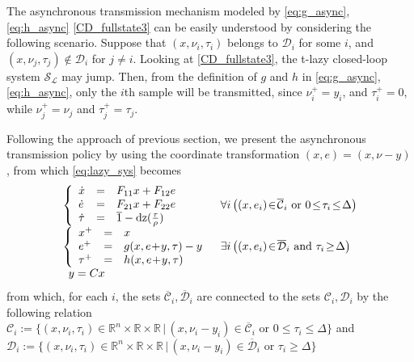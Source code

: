 \documentclass[twocolumn]{autart}
\newcommand{\realn}{\real^n}
\newcommand\real{\ensuremath{{\mathbb R}}}
\newcommand\dz{\mathrm{dz}}
\begin{document}
{
The asynchronous transmission mechanism modeled by  
\eqref{eq:g_async}, \eqref{eq:h_async} \eqref{CD_fullstate3} 
can be easily understood by considering the following scenario.
}
Suppose that $(x,\nu_i,\tau_i)$ belongs to $\mathcal{D}_i$
for some $i$, and $(x,\nu_j,\tau_j) \notin \mathcal{D}_i$ for $j\neq i$. 
Looking at \eqref{CD_fullstate3}, the t-lazy closed-loop system 
$\mathcal{S}_\mathcal{L}$ may jump. Then,
from the definition of $g$ and $h$  in \eqref{eq:g_async}, 
\eqref{eq:h_async}, only the $i$th sample
will be transmitted, since $\nu_i^+ = y_i$, and $\tau_i^+=0$, 
while $\nu_j^+=\nu_j$ and $\tau_j^+=\tau_j$.



Following the approach of previous section, we present the asynchronous
transmission policy by using the coordinate 
transformation $(x,e)=(x,\nu-y)$, from which \eqref{eq:lazy_sys} becomes
\begin{equation}
\label{eq:elazy_sys2}
\begin{array}{ll}
	 \left\{ \begin{array}{lll}
	 \dot{x} & = & F_{11}x + F_{12}e  \\
  	 \dot{e} & = & F_{21}x  +F_{22}e \\
	 \dot{\tau} &=& \overline{1}-\dz(\frac{\tau}{\rho}) \\
	 \end{array}\right. \hspace{2mm}  & 
	 \forall i\,\big(
	  (x,e_i)\!\in\! \overline{\mathcal{C}}_i 
	  \mbox{ or } 0 \!\leq\! \tau_i \!\leq\! \Delta
	  \big) \\
	 \left\{\begin{array}{lll}
	 {x}^+ & = & x \\
	 {e}^+ & = & g(x,e\!+\!y,\tau) - y \\ 
	 {\tau}^+ & = & h(x,e\!+\!y,\tau)\\ 
	 \end{array} \right.  & 
         \exists i\,\big(
	  (x,e_i)\!\in\! \overline{\mathcal{D}}_i 
	  \mbox{ and } \tau_i \!\geq\! \Delta
	  \big)  \\
	 \begin{array}{lll}
		y = Cx  \hspace{16mm} & & \\
	 \end{array} &
 \end{array}
\end{equation}
from which, for each $i$, the sets $\overline{\mathcal{C}}_i,\overline{\mathcal{D}}_i$
are connected to the sets $\mathcal{C}_i,\mathcal{D}_i$ by the following relation
$\mathcal{C}_i :=
\{(x,\nu_i,\tau_i) \in \realn \times \real \times \real \,|\, 
(x,\nu_i-y_i)\in \overline{\mathcal{C}}_i \mbox{ or } 0 \leq \tau_i \leq \Delta \}$
and 
$\mathcal{D}_i :=
\{(x,\nu_i,\tau_i) \in \realn \times \real \times \real \,|\, 
(x,\nu_i-y_i)\in \overline{\mathcal{D}}_i \mbox{ or } \tau_i \geq \Delta \}$
\end{document}
